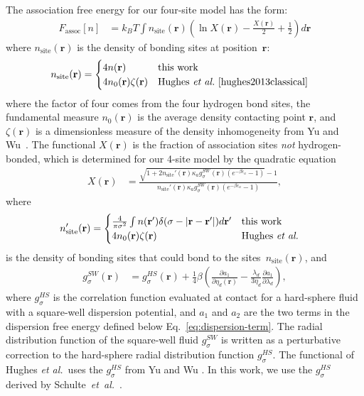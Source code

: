 \documentclass[preprint, endfloats,amsmath,amssymb,jcp]{revtex4-1}
\newcommand{\rr}{\textbf{r}}
\newcommand{\xx}{\textbf{r}}
\newcommand\etadisp{\ensuremath{\eta_\textit{d}}}
\newcommand\epsilonassoc{\ensuremath{\epsilon_\textit{a}}}
\newcommand\kappaassoc{\ensuremath{\kappa_\textit{a}}}
\newcommand\lambdadisp{\ensuremath{\lambda_\textit{d}}}
\newcommand\hughesetal{Hughes \emph{et al.}}
\newcommand\hughesetalcite{Hughes \emph{et al.}~\cite{hughes2013classical}}
\begin{document}
The association free energy for our four-site model has the form:
\begin{align}
  F_\text{assoc}[n] &= k_BT \int n_\text{site}(\xx)
  \left(\ln X(\xx) - \frac{X(\xx)}{2} + \frac12\right) d\xx
\end{align}
where $n_\text{site}(\rr)$ is the density of bonding sites at
position~$\rr$:
\begin{align}
  n_\text{site}(\rr) &=
  \begin{cases}
    4 n(\rr) & \text{this work}\\
    4 n_0(\rr) \zeta(\rr) & \text{\hughesetalcite}
  \end{cases}
\end{align}
where the factor of four comes from the four hydrogen bond sites, the
fundamental measure $n_0(\rr)$ is the average density contacting point
$\rr$, and $\zeta(\xx)$ is a dimensionless measure of the density
inhomogeneity from Yu and
Wu~\cite{yu2002fmt-dft-inhomogeneous-associating}.  The functional
$X(\rr)$ is the fraction of association sites \emph{not}
hydrogen-bonded, which is determined for our 4-site model by the
quadratic equation
\begin{align}
  X(\xx) &= \frac{\sqrt{1 + 2n_\text{site}'(\rr)
      \kappaassoc g^\textit{SW}_\sigma(\xx)
  \left(e^{-\beta\epsilonassoc} - 1\right)} - 1}
  {n_\text{site}'(\rr)
    \kappaassoc g^\textit{SW}_\sigma(\xx)
  \left(e^{-\beta\epsilonassoc} - 1\right)}, \label{eq:X}
\end{align}
where
\begin{align}
  n_\text{site}'(\rr) &=
  \begin{cases}
    \frac{4}{\pi\sigma^2} \int n(\rr')\delta(\sigma - |\rr-\rr'|) d\rr' & \text{this work}\\
    4 n_0(\rr) \zeta(\rr) & \text{\hughesetal}
  \end{cases} 
\end{align}
is the density of bonding sites that could bond to the sites~$n_\text{site}(\rr)$, and
\begin{align}
  g^\textit{SW}_\sigma(\xx) &= g^\textit{HS}_\sigma(\xx) +
  \frac{1}{4}\beta\left(\frac{\partial a_1}{\partial \etadisp(\xx)} -
  \frac{\lambdadisp}{3 \etadisp}\frac{\partial a_1}{\partial \lambdadisp}\right)\label{eq:gSW},
\end{align}
where $g^\textit{HS}_\sigma$ is the correlation function evaluated at
contact for a hard-sphere fluid with a square-well dispersion
potential, and $a_1$ and $a_2$ are the two terms in the dispersion
free energy defined below Eq.~\ref{eq:dispersion-term}.  The radial distribution function of the square-well
fluid $g^\textit{SW}_\sigma$ is written as a perturbative correction
to the hard-sphere radial distribution function
$g^\textit{HS}_\sigma$.  The functional of \hughesetal\ uses the
$g_\sigma^\textit{HS}$ from Yu and Wu
\cite{yu2002fmt-dft-inhomogeneous-associating}.  In this work, we use
the $g_\sigma^\textit{HS}$ derived by Schulte~\emph{et~al.}~\cite{schulte2012using}.
\end{document}
